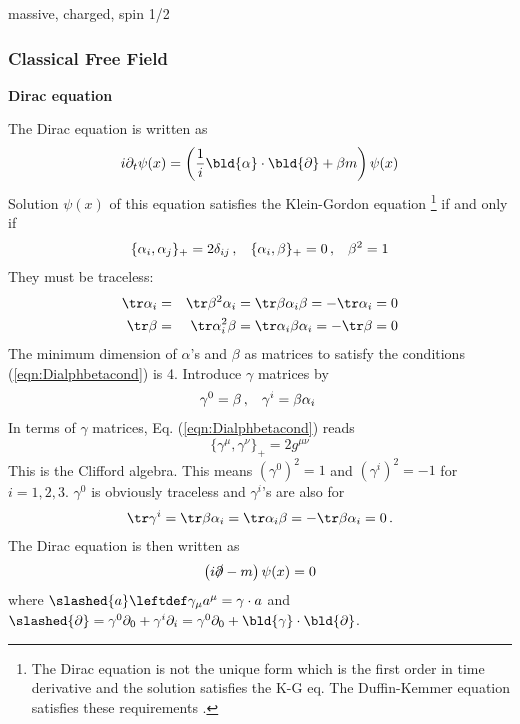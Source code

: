 \noindent
massive, charged, spin 1/2
\subsubsection{Classical Free Field}
\noindent
{\bf Dirac equation}

The Dirac equation is written as
\begin{eqnarray}
i \partial_t \psi (x) = 
\left(
\frac{1}{i} \bld{\alpha} \cdot \bld{\partial} + \beta m \right) \psi(x)
\end{eqnarray}
Solution $\psi(x)$ of this equation satisfies the Klein-Gordon equation
\footnote{
The Dirac equation is not the unique form which is
the first order in time derivative and the solution satisfies the K-G eq.
The Duffin-Kemmer equation satisfies these requirements
\cite{ref:Itzykson-Zuber}.
 } %
if and only if
\begin{eqnarray}
\{ \alpha_i, \alpha_j \}_+ = 2\delta_{ij}\,,
\hspace{3mm}
\{ \alpha_i, \beta \}_+ = 0\,,
\hspace{3mm}
\beta^2 = 1
\label{eqn:Dialphbetacond}
\end{eqnarray}
They must be traceless:
\begin{eqnarray}
\tr \alpha_i &=& \tr \beta^2 \alpha_i = \tr \beta \alpha_i \beta = - \tr \alpha_i = 0
\nonumber\\
\tr \beta &=& \tr \alpha_i^2 \beta  = \tr \alpha_i \beta \alpha_i  = - \tr \beta = 0
\nonumber
\end{eqnarray}
The minimum dimension of $\alpha$'s and $\beta$ as matrices to satisfy the conditions 
(\ref{eqn:Dialphbetacond}) is 4. 
Introduce $\gamma$ matrices by
\begin{eqnarray}
\gamma^0 = \beta\,,
\hspace{3mm}
\gamma^i = \beta \alpha_i\
\end{eqnarray}
In terms of $\gamma$ matrices, Eq. (\ref{eqn:Dialphbetacond}) reads
\begin{equation}
\{ \gamma^\mu, \gamma^\nu \}_+ = 2 g^{\mu \nu}
\end{equation}
This is the Clifford algebra. This means $(\gamma^0)^2 = 1$ and $(\gamma^i)^2 = -1$ for $i = 1,2,3$.
$\gamma^0$ is obviously traceless and $\gamma^i$'s are also for
\begin{eqnarray}
\tr \gamma^i = \tr \beta \alpha_i = \tr \alpha_i \beta = -\tr \beta \alpha_i = 0\,.
\end{eqnarray}
The Dirac equation is then written as
\begin{eqnarray}
\left( i\slashed{\partial} - m \right) \psi(x) = 0
\label{eqn:DiracEqstandard}
\end{eqnarray}
where $\slashed{a} \leftdef \gamma_\mu a^\mu = \gamma \cdot a$ and
$\slashed{\partial} = \gamma^0 \partial_0 + \gamma^i \partial_i = \gamma^0 \partial_0 + \bld{\gamma}\cdot \bld{\partial}$.

